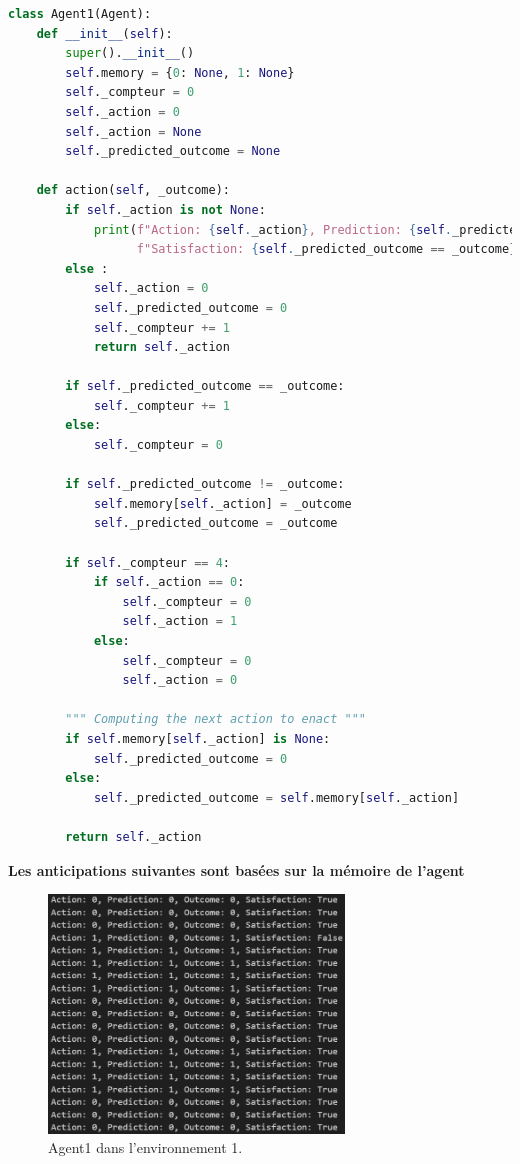 \documentclass[a4paper, 12pt]{article}
\begin{document}
\begin{lstlisting}[language=Python, caption={Implementation de l'Agent1}]
    class Agent1(Agent):
    def __init__(self):
        super().__init__()
        self.memory = {0: None, 1: None}
        self._compteur = 0
        self._action = 0
        self._action = None
        self._predicted_outcome = None
        
    def action(self, _outcome):
        if self._action is not None:
            print(f"Action: {self._action}, Prediction: {self._predicted_outcome}, Outcome: {_outcome}, " 
                  f"Satisfaction: {self._predicted_outcome == _outcome}")
        else :
            self._action = 0
            self._predicted_outcome = 0
            self._compteur += 1
            return self._action

        if self._predicted_outcome == _outcome:
            self._compteur += 1
        else:
            self._compteur = 0
            
        if self._predicted_outcome != _outcome:
            self.memory[self._action] = _outcome
            self._predicted_outcome = _outcome

        if self._compteur == 4:
            if self._action == 0:
                self._compteur = 0
                self._action = 1
            else:
                self._compteur = 0
                self._action = 0

        """ Computing the next action to enact """
        if self.memory[self._action] is None:
            self._predicted_outcome = 0
        else:
            self._predicted_outcome = self.memory[self._action]
        
        return self._action
\end{lstlisting}

\bigskip

\noindent \large \textbf{Les anticipations suivantes sont basées sur la mémoire de l'agent}
\normalsize

\begin{figure}[h]
    \centering
    \includegraphics[width=0.7\textwidth]{ReportImages/Agent1/Agent1_Env1.png}
    \caption{Agent1 dans l'environnement 1.}
\end{figure}
\end{document}

